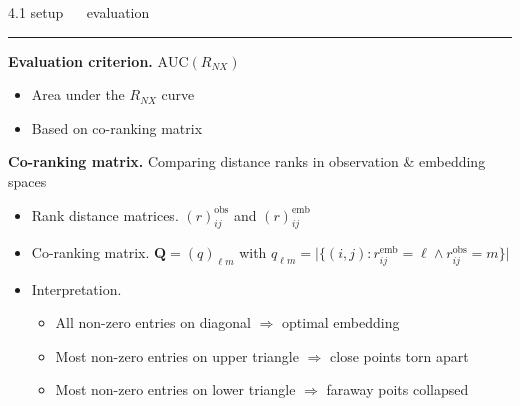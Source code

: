 \documentclass[11pt, compress, t, notes = noshow, xcolor = table, 
aspectratio = 1610]{beamer}
\newcommand{\highlight}[1]{\textcolor{highlightcol}{\textbf{#1}}}
\newcommand{\arritem}{\item[\highlight{$\rightarrow$}]}
\newcommand{\flexitem}[1]{\item[$\highlight{#1}$]}
\begin{document}
\LARGE
\begin{frame}{\textcolor{gray!90}{4.1 setup} ~~ evaluation}
\normalsize
\vspace{-0.5cm}
\noindent \textcolor{gray!90}{\rule{\textwidth}{1pt}}
\smallskip

\textbf{Evaluation criterion.} $\text{AUC}(R_{NX})$ \citep{kraemeretal2019}

\begin{itemize}
  \arritem Area under the $R_{NX}$ curve
  \arritem Based on co-ranking matrix
\end{itemize}

\vspace{0.3cm}

\textbf{Co-ranking matrix.} Comparing distance ranks in observation \& embedding 
spaces

\begin{itemize}
  \arritem Rank distance matrices. $(r)_{ij}^{\text{obs}}$ and
  $(r)_{ij}^{\text{emb}}$
  \arritem Co-ranking matrix. $\bm{Q} = (q)_{\ell m}$ with $q_{\ell m} = 
  \rvert \{ (i, j): 
  r_{ij}^{\text{emb}} = \ell \land r_{ij}^{\text{obs}} = m \} 
  \rvert$ 
  \arritem Interpretation.
  \begin{itemize}
    \flexitem{1} All non-zero entries on diagonal $\Rightarrow$ optimal 
    embedding
    \flexitem{2} Most non-zero entries on upper triangle $\Rightarrow$ close 
    points torn apart
    \flexitem{3} Most non-zero entries on lower triangle $\Rightarrow$ faraway 
    poits collapsed
  \end{itemize}
\end{itemize}

\end{frame}

\end{document}
